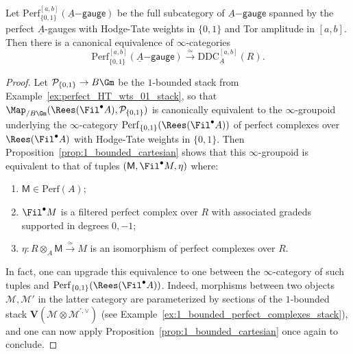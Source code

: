 \documentclass[10pt]{amsart}
\begin{document}
\begin{proposition}
\label{prop:adm_dieudonne}
Let $\mathrm{Perf}_{\{0,1\}}^{[a,b]}(\underline{A}\mathsf{-gauge})$ be the full subcategory of $\underline{A}\mathsf{-gauge}$ spanned by the perfect $\underline{A}$-gauges with Hodge-Tate weights in $\{0,1\}$ and Tor amplitude in $[a,b]$. Then there is a canonical equivalence of $\infty$-categories
\[
\mathrm{Perf}_{\{0,1\}}^{[a,b]}(\underline{A}\mathsf{-gauge})\xrightarrow{\simeq}\mathrm{DDC}^{[a,b]}_{\underline{A}}(R).
\]
\end{proposition}

\begin{proof}
Let $\mathcal{P}_{\{0,1\}}\to B\Gm$ be the $1$-bounded stack from Example~\ref{ex:perfect_HT_wts_01_stack}, so that $\Map_{/B\Gm}(\Rees(\Fil^\bullet A),\mathcal{P}_{\{0,1\}})$ is canonically equivalent to the $\infty$-groupoid underlying the $\infty$-category $\mathrm{Perf}_{\{0,1\}}(\Rees(\Fil^\bullet A))$ of perfect complexes over $\Rees(\Fil^\bullet A)$ with Hodge-Tate weights in $\{0,1\}$. Then Proposition~\ref{prop:1_bounded_cartesian} shows that this $\infty$-groupoid is equivalent to that of tuples $(\mathsf{M},\Fil^\bullet M,\eta)$ where:
\begin{enumerate}
   \item $\mathsf{M}\in \mathrm{Perf}(A)$;
   \item $\Fil^\bullet M$ is a filtered perfect complex over $R$ with associated gradeds supported in degrees $0,-1$;
   \item $\eta:R\otimes_A\mathsf{M}\xrightarrow{\simeq}M$ is an isomorphism of perfect complexes over $R$.
\end{enumerate}
In fact, one can upgrade this equivalence to one between the $\infty$-category of such tuples and $\mathrm{Perf}_{\{0,1\}}(\Rees(\Fil^\bullet A))$. Indeed, morphisms between two objects $\mathcal{M},\mathcal{M}'$ in the latter category are parameterized by sections of the $1$-bounded stack $\mathbf{V}(\mathcal{M}\otimes \mathcal{M}^{',\vee})$ (see Example~\ref{ex:1_bounded_perfect_complexes_stack}), and one can now apply Proposition~\ref{prop:1_bounded_cartesian} once again to conclude. 



\end{proof}
\end{document}

